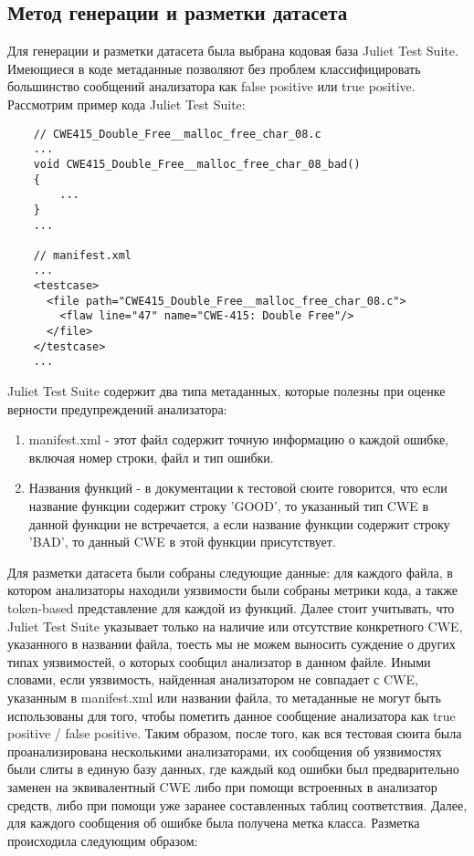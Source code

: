 \subsection{Метод генерации и разметки датасета}
Для генерации и разметки датасета была выбрана кодовая база Juliet Test Suite\cite{Juliet}. Имеющиеся в коде метаданные позволяют без проблем классифицировать большинство сообщений анализатора как false positive или true positive. Рассмотрим пример кода Juliet Test Suite:

\begin{verbatim}
    // CWE415_Double_Free__malloc_free_char_08.c
    ...
    void CWE415_Double_Free__malloc_free_char_08_bad()
    {
        ...
    }
    ...

    // manifest.xml
    ...
    <testcase>
      <file path="CWE415_Double_Free__malloc_free_char_08.c">
        <flaw line="47" name="CWE-415: Double Free"/>
      </file>
    </testcase>
    ...
\end{verbatim}

Juliet Test Suite содержит два типа метаданных, которые полезны при оценке верности предупреждений анализатора:
\begin{enumerate}
    \item manifest.xml - этот файл содержит точную информацию о каждой ошибке, включая номер строки, файл и тип ошибки.
    \item Названия функций - в документации к тестовой сюите говорится, что если название функции содержит строку 'GOOD', то указанный тип CWE в данной функции не встречается, а если название функции содержит строку 'BAD', то данный CWE в этой функции присутствует.
\end{enumerate}

Для разметки датасета были собраны следующие данные: для каждого файла, в котором анализаторы находили уязвимости были собраны метрики кода, а также token-based представление для каждой из функций. Далее стоит учитывать, что Juliet Test Suite указывает только на наличие или отсутствие конкретного CWE, указанного в названии файла, тоесть мы не можем выносить суждение о других типах уязвимостей, о которых сообщил анализатор в данном файле. Иными словами, если уязвимость, найденная анализатором не совпадает с CWE, указанным в manifest.xml или названии файла, то метаданные не могут быть использованы для того, чтобы пометить данное сообщение анализатора как true positive / false positive. Таким образом, после того, как вся тестовая сюита была проанализирована несколькими анализаторами, их сообщения об уязвимостях были слиты в единую базу данных, где каждый код ошибки был предварительно заменен на эквивалентный CWE либо при помощи встроенных в анализатор средств, либо при помощи уже заранее составленных таблиц соответствия. Далее, для каждого сообщения об ошибке была получена метка класса. Разметка происходила следующим образом:

